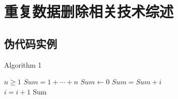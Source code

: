 \chapter{重复数据删除相关技术综述}\thispagestyle{main}
\section{伪代码实例}
\begin{algorithm}
\caption{Algorithm 1}
\begin{algorithmic}[1] %
    \REQUIRE $n \geq 1$                  %
    \ENSURE $Sum = 1 + \cdots + n$       %
    \STATE $Sum \leftarrow 0$            %
    \ELSE
            \STATE $Sum = Sum + i$\\
            \STATE $i = i + 1$
        \ENDFOR
    \ENDIF
    \RETURN Sum
\end{algorithmic}
\end{algorithm}
